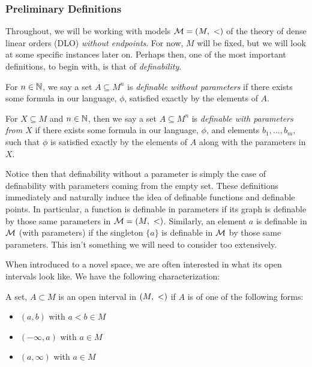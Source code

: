 \subsubsection{Preliminary Definitions}
\label{sec:prelim-defns}
Throughout, we will be working with models $ \mathcal{M} = (M, \ <)$ of the theory of dense linear orders (DLO) \emph{without endpoints}. For now, $M$ will be fixed, but we will look at some specific instances later on. Perhaps then, one of the most important definitions, to begin with, is that of \emph{definability}.

\begin{definition}
For $n \in \mathbb{N}$, we say a set $A \subseteq M^n$ is \emph{definable without parameters} if there exists some formula in our language, $ \phi$, satisfied exactly by the elements of $A$.
\end{definition}

\begin{definition}
For $X \subseteq M$ and $n \in \mathbb{N}$, then we say a set $A \subseteq M^n$ is \emph{definable with parameters from $X$} if there exists some formula in our language, $ \phi$, and elements $b_1, \hdots, b_m$, such that $ \phi$ is satisfied exactly by the elements of $A$ along with the parameters in $X$.
\end{definition}

Notice then that definability without a parameter is simply the case of definability with parameters coming from the empty set. These definitions immediately and naturally induce the idea of definable functions and definable points. In particular, a function is definable in parameters if its graph is definable by those same parameters in $\mathcal{M} = (M, \ <)$. Similarly, an element $a$ is definable in $\mathcal{M}$ (with parameters) if the singleton $\{a\}$ is definable in $ \mathcal{M}$ by those same parameters. This isn't something we will need to consider too extensively.

When introduced to a novel space, we are often interested in what its open intervals look like. We have the following characterization:

\begin{definition}
  A set, $A \subset M$ is an open interval in $(M, \ <)$ if $A$ is of one of the following forms:
  \begin{itemize}
    \item $(a, b)$ with $a < b \in M$
    \item $(- \infty, a)$ with $a \in M$
    \item $(a, \infty)$ with $a \in M$
  \end{itemize}
\end{definition}

